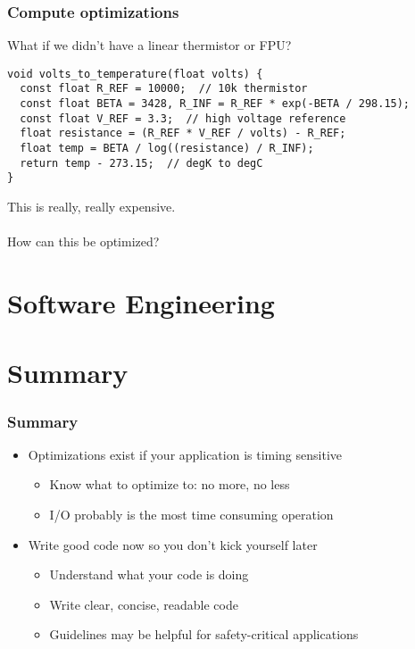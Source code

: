\documentclass{beamer}
\begin{document}
\begin{frame}[fragile]
\frametitle{Compute optimizations}
What if we didn't have a linear thermistor or FPU?
{\tiny \begin{lstlisting}
void volts_to_temperature(float volts) {
  const float R_REF = 10000;  // 10k thermistor
  const float BETA = 3428, R_INF = R_REF * exp(-BETA / 298.15);
  const float V_REF = 3.3;  // high voltage reference
  float resistance = (R_REF * V_REF / volts) - R_REF;
  float temp = BETA / log((resistance) / R_INF);
  return temp - 273.15;  // degK to degC
}
\end{lstlisting}
}
This is really, really expensive. \\
\hfill \\
How can this be optimized?
\end{frame}

\section{Software Engineering} %


\section{Summary} %

\begin{frame}
\frametitle{Summary}
\begin{itemize}
  \item Optimizations exist if your application is timing sensitive
  \begin{itemize}
    \item Know what to optimize to: no more, no less
    \item I/O probably is the most time consuming operation
  \end{itemize}
  \item Write good code now so you don't kick yourself later
  \begin{itemize}
    \item Understand what your code is doing
    \item Write clear, concise, readable code
    \item Guidelines may be helpful for safety-critical applications
  \end{itemize}  
\end{itemize}
\end{frame}
\end{document}
